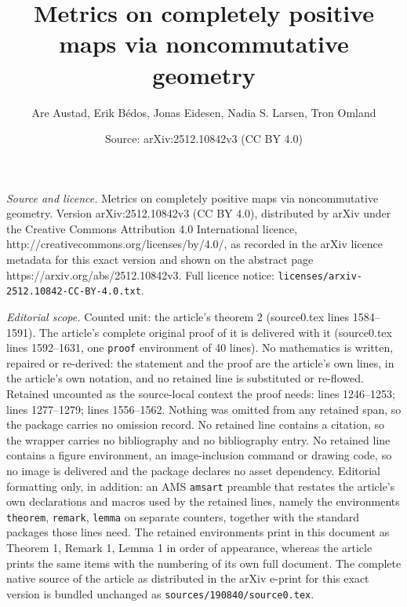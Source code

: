 \documentclass[10pt,a4paper]{amsart}
\title{Metrics on completely positive maps via noncommutative geometry}
\author{Are Austad, Erik B\'edos, Jonas Eidesen, Nadia S. Larsen, Tron Omland}
\date{Source: arXiv:2512.10842v3 (CC BY 4.0)}
\begin{document}
\maketitle

\noindent\emph{Source and licence.} Metrics on completely positive maps via noncommutative geometry. Version arXiv:2512.10842v3 (CC BY 4.0), distributed by arXiv under the Creative Commons Attribution 4.0 International licence, http://creativecommons.org/licenses/by/4.0/, as recorded in the arXiv licence metadata for this exact version and shown on the abstract page https://arxiv.org/abs/2512.10842v3. Full licence notice: \texttt{licenses/arxiv-2512.10842-CC-BY-4.0.txt}.\par\smallskip

\noindent\textit{Editorial scope.} Counted unit: the article's theorem 2 (source0.tex lines 1584--1591). The article's complete original proof of it is delivered with it (source0.tex lines 1592--1631, one \texttt{proof} environment of 40 lines). No mathematics is written, repaired or re-derived: the statement and the proof are the article's own lines, in the article's own notation, and no retained line is substituted or re-flowed.  Retained uncounted as the source-local context the proof needs: lines 1246--1253; lines 1277--1279; lines 1556--1562.  Nothing was omitted from any retained span, so the package carries no omission record.  No retained line contains a citation, so the wrapper carries no bibliography and no bibliography entry.  No retained line contains a figure environment, an image-inclusion command or drawing code, so no image is delivered and the package declares no asset dependency.  Editorial formatting only, in addition: an AMS \texttt{amsart} preamble that restates the article's own declarations and macros used by the retained lines, namely the environments \texttt{theorem}, \texttt{remark}, \texttt{lemma} on separate counters, together with the standard packages those lines need.  The retained environments print in this document as Theorem 1, Remark 1, Lemma 1 in order of appearance, whereas the article prints the same items with the numbering of its own full document.  The complete native source of the article as distributed in the arXiv e-print for this exact version is bundled unchanged as \texttt{sources/190840/source0.tex}.
\end{document}
